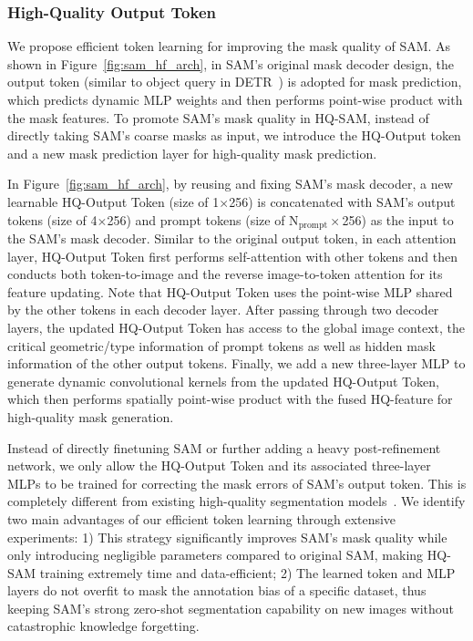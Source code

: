 \subsubsection{High-Quality Output Token} We propose efficient token learning for improving the mask quality of SAM. As shown in Figure~\ref{fig:sam_hf_arch}, in SAM's original mask decoder design, the output token (similar to object query in DETR~\cite{carion2020end}) is adopted for mask prediction, which predicts dynamic MLP weights and then performs point-wise product with the mask features. To promote SAM's mask quality in HQ-SAM, instead of directly taking SAM's coarse masks as input, we introduce the HQ-Output token and a new mask prediction layer for high-quality mask prediction.

In Figure~\ref{fig:sam_hf_arch}, by reusing and fixing SAM's mask decoder, a new learnable HQ-Output Token (size of 1$\times$256) is concatenated with SAM's output tokens (size of 4$\times$256) and prompt tokens (size of N$_\text{prompt}\times$256) as the input to the SAM's mask decoder. Similar to the original output token, in each attention layer, HQ-Output Token first performs self-attention with other tokens and then conducts both token-to-image and the reverse image-to-token attention for its feature updating. Note that HQ-Output Token uses the point-wise MLP shared by the other tokens in each decoder layer. After passing through two decoder layers, the updated HQ-Output Token has access to the global image context, the critical geometric/type information of prompt tokens as well as hidden mask information of the other output tokens. Finally, we add a new three-layer MLP to generate dynamic convolutional kernels from the updated HQ-Output Token, which then performs spatially point-wise product with the fused HQ-feature for high-quality mask generation.

Instead of directly finetuning SAM or further adding a heavy post-refinement network, we only allow the HQ-Output Token and its associated three-layer MLPs to be trained for correcting the mask errors of SAM's output token. This is completely different from existing high-quality segmentation models~\cite{transfiner,cascadepsp,vmt,kirillov2020pointrend}. We identify two main advantages of our efficient token learning through extensive experiments: 1) This strategy significantly improves SAM's mask quality while only introducing negligible parameters compared to original SAM, making HQ-SAM training extremely time and data-efficient; 2) The learned token and MLP layers do not overfit to mask the annotation bias of a specific dataset, thus keeping SAM's strong zero-shot segmentation capability on new images without catastrophic knowledge forgetting.

